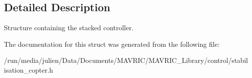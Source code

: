 \subsection{Detailed Description}
Structure containing the stacked controller. 

The documentation for this struct was generated from the following file\+:\begin{DoxyCompactItemize}
\item 
/run/media/julien/\+Data/\+Documents/\+M\+A\+V\+R\+I\+C/\+M\+A\+V\+R\+I\+C\+\_\+\+Library/control/stabilisation\+\_\+copter.\+h\end{DoxyCompactItemize}
